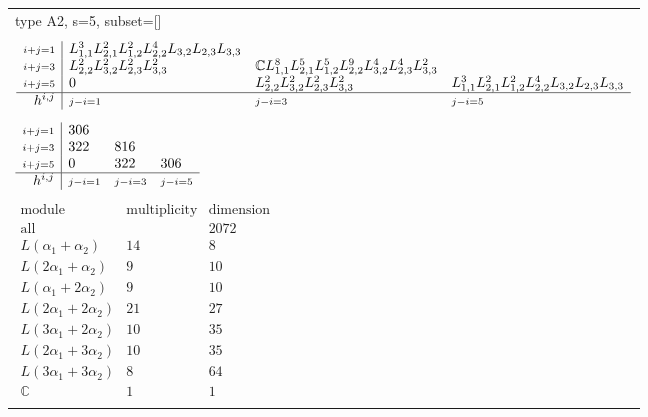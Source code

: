 \documentclass[crop,border=2mm]{standalone}
\begin{document}
\begin{tabular}{l}
{\huge type A2, s=5, subset=[]}\\ \\


$\displaystyle
\begin{array}{r|l l l}
	{\scriptstyle i+j=1}&L_{1,1}^{3}L_{2,1}^{2}L_{1,2}^{2}L_{2,2}^{4}L_{3,2}L_{2,3}L_{3,3}&&\\
	{\scriptstyle i+j=3}&L_{2,2}^{2}L_{3,2}^{2}L_{2,3}^{2}L_{3,3}^{2}&\mathbb{C}L_{1,1}^{8}L_{2,1}^{5}L_{1,2}^{5}L_{2,2}^{9}L_{3,2}^{4}L_{2,3}^{4}L_{3,3}^{2}&\\
	{\scriptstyle i+j=5}&0&L_{2,2}^{2}L_{3,2}^{2}L_{2,3}^{2}L_{3,3}^{2}&L_{1,1}^{3}L_{2,1}^{2}L_{1,2}^{2}L_{2,2}^{4}L_{3,2}L_{2,3}L_{3,3}\\
	\hline h^{i,j}&{\scriptstyle j-i=1}&{\scriptstyle j-i=3}&{\scriptstyle j-i=5}
\end{array}
$ \\ \\


$\displaystyle
\begin{array}{r|l l l}
	{\scriptstyle i+j=1}&306&&\\
	{\scriptstyle i+j=3}&322&816&\\
	{\scriptstyle i+j=5}&0&322&306\\
	\hline h^{i,j}&{\scriptstyle j-i=1}&{\scriptstyle j-i=3}&{\scriptstyle j-i=5}
\end{array}
$ \\ \\


$\displaystyle
\begin{array}{rll}
	\text{module}&\text{multiplicity}&\text{dimension} \\ \hline \text{all}&&2072 \\
	L\left(\alpha_{1}+\alpha_{2}\right)&14&8\\
	L\left( 2\alpha_{1}+\alpha_{2}\right)&9&10\\
	L\left(\alpha_{1}+ 2\alpha_{2}\right)&9&10\\
	L\left( 2\alpha_{1}+ 2\alpha_{2}\right)&21&27\\
	L\left( 3\alpha_{1}+ 2\alpha_{2}\right)&10&35\\
	L\left( 2\alpha_{1}+ 3\alpha_{2}\right)&10&35\\
	L\left( 3\alpha_{1}+ 3\alpha_{2}\right)&8&64\\
	\mathbb{C}&1&1
\end{array}
$ \\ \\

\end{tabular}
\end{document}
